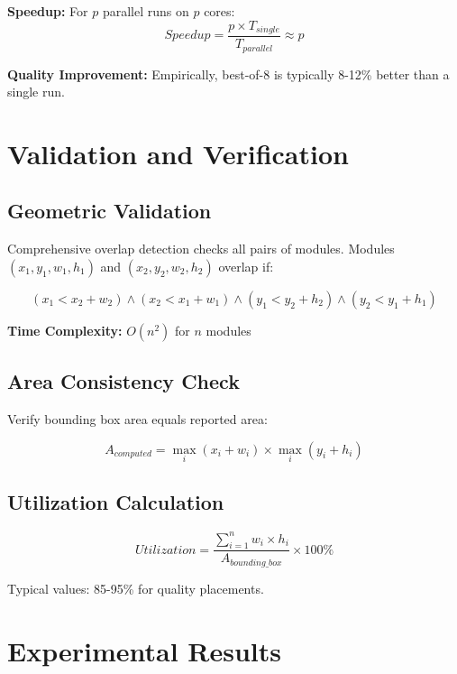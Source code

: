 \documentclass[11pt]{article}
\begin{document}
\textbf{Speedup:} For $p$ parallel runs on $p$ cores:
\begin{equation}
Speedup = \frac{p \times T_{single}}{T_{parallel}} \approx p
\end{equation}

\textbf{Quality Improvement:} Empirically, best-of-8 is typically 8-12\% better than a single run.

\section{Validation and Verification}

\subsection{Geometric Validation}

Comprehensive overlap detection checks all pairs of modules. Modules $(x_1, y_1, w_1, h_1)$ and $(x_2, y_2, w_2, h_2)$ overlap if:

\begin{equation}
(x_1 < x_2 + w_2) \land (x_2 < x_1 + w_1) \land (y_1 < y_2 + h_2) \land (y_2 < y_1 + h_1)
\end{equation}

\textbf{Time Complexity:} $O(n^2)$ for $n$ modules

\subsection{Area Consistency Check}

Verify bounding box area equals reported area:

\begin{equation}
A_{computed} = \max_i (x_i + w_i) \times \max_i (y_i + h_i)
\end{equation}

\subsection{Utilization Calculation}

\begin{equation}
Utilization = \frac{\sum_{i=1}^n w_i \times h_i}{A_{bounding\_box}} \times 100\%
\end{equation}

Typical values: 85-95\% for quality placements.

\section{Experimental Results}
\end{document}
